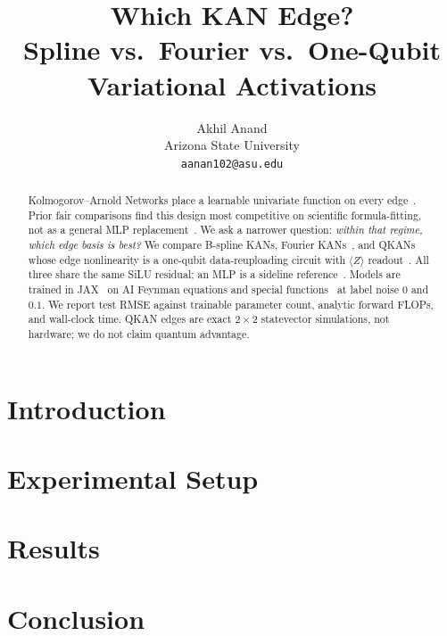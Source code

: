\documentclass[11pt]{article}
\title{Which KAN Edge?\\
  \large Spline vs.\ Fourier vs.\ One-Qubit Variational Activations}
\author{
  Akhil Anand\\
  Arizona State University\\
  \texttt{aanan102@asu.edu}
}
\date{}
\begin{document}
\maketitle

\begin{abstract}
Kolmogorov--Arnold Networks place a learnable univariate function on every
edge~\citep{liu2024kan}. Prior fair comparisons find this design most
competitive on scientific formula-fitting, not as a general MLP
replacement~\citep{yu2024fairer}. We ask a narrower question: \emph{within
that regime, which edge basis is best?} We compare B-spline KANs, Fourier
KANs~\citep{xu2024fourierkan,mehrabian2024fourierkan}, and QKANs whose edge
nonlinearity is a one-qubit data-reuploading circuit with $\langle Z\rangle$
readout~\citep{jiang2025qkan,perezsalinas2020reuploading}. All three share the
same SiLU residual; an MLP is a sideline
reference~\citep{rumelhart1986backprop}. Models are trained in
JAX~\citep{eigenflow2026} on AI Feynman equations and special
functions~\citep{udrescu2019aifeynman} at label noise $0$ and $0.1$. We
report test RMSE against trainable parameter count, analytic forward FLOPs,
and wall-clock time. QKAN edges are exact $2\times 2$ statevector simulations,
not hardware; we do not claim quantum advantage.
\end{abstract}

\section{Introduction}
\label{sec:intro}

\section{Experimental Setup}
\label{sec:setup}

\section{Results}
\label{sec:results}

\section{Conclusion}
\label{sec:conclusion}



\end{document}
